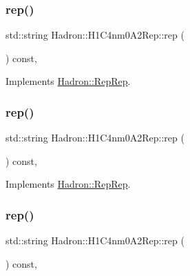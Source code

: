 \subsubsection{\texorpdfstring{rep()}{rep()}\hspace{0.1cm}{\footnotesize\ttfamily [1/3]}}
{\footnotesize\ttfamily std\+::string Hadron\+::\+H1\+C4nm0\+A2\+Rep\+::rep (\begin{DoxyParamCaption}{ }\end{DoxyParamCaption}) const\hspace{0.3cm}{\ttfamily [inline]}, {\ttfamily [virtual]}}



Implements \mbox{\hyperlink{structHadron_1_1RepRep_ab3213025f6de249f7095892109575fde}{Hadron\+::\+Rep\+Rep}}.

\mbox{\label{structHadron_1_1H1C4nm0A2Rep_aa814381161d711ca3fb036897c27ec86}} 
\subsubsection{\texorpdfstring{rep()}{rep()}\hspace{0.1cm}{\footnotesize\ttfamily [2/3]}}
{\footnotesize\ttfamily std\+::string Hadron\+::\+H1\+C4nm0\+A2\+Rep\+::rep (\begin{DoxyParamCaption}{ }\end{DoxyParamCaption}) const\hspace{0.3cm}{\ttfamily [inline]}, {\ttfamily [virtual]}}



Implements \mbox{\hyperlink{structHadron_1_1RepRep_ab3213025f6de249f7095892109575fde}{Hadron\+::\+Rep\+Rep}}.

\mbox{\label{structHadron_1_1H1C4nm0A2Rep_aa814381161d711ca3fb036897c27ec86}} 
\subsubsection{\texorpdfstring{rep()}{rep()}\hspace{0.1cm}{\footnotesize\ttfamily [3/3]}}
{\footnotesize\ttfamily std\+::string Hadron\+::\+H1\+C4nm0\+A2\+Rep\+::rep (\begin{DoxyParamCaption}{ }\end{DoxyParamCaption}) const\hspace{0.3cm}{\ttfamily [inline]}, {\ttfamily [virtual]}}



